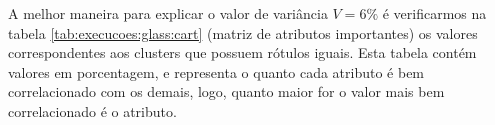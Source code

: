 
A melhor maneira para explicar o valor de variância  ${V=6\%}$ é verificarmos na tabela \ref{tab:execucoes:glass:cart} (matriz de atributos importantes) os valores correspondentes aos clusters que possuem rótulos iguais. Esta tabela contém valores em porcentagem, e representa o quanto cada atributo é bem correlacionado com os demais, logo, quanto maior for o valor mais bem correlacionado é o atributo. 


\begin{table}[!h]
\centering
\caption{Matriz de Atributos Importantes do algoritmo CART na base Glass}
\label{tab:execucoes:glass:cart}
\end{table}    

